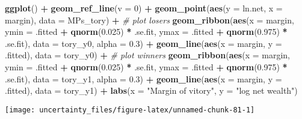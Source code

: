 \documentclass[]{book}
\newenvironment{Shaded}{\begin{snugshade}}{\end{snugshade}}
\newcommand{\KeywordTok}[1]{\textcolor[rgb]{0.13,0.29,0.53}{\textbf{#1}}}
\newcommand{\DataTypeTok}[1]{\textcolor[rgb]{0.13,0.29,0.53}{#1}}
\newcommand{\DecValTok}[1]{\textcolor[rgb]{0.00,0.00,0.81}{#1}}
\newcommand{\FloatTok}[1]{\textcolor[rgb]{0.00,0.00,0.81}{#1}}
\newcommand{\StringTok}[1]{\textcolor[rgb]{0.31,0.60,0.02}{#1}}
\newcommand{\CommentTok}[1]{\textcolor[rgb]{0.56,0.35,0.01}{\textit{#1}}}
\newcommand{\OperatorTok}[1]{\textcolor[rgb]{0.81,0.36,0.00}{\textbf{#1}}}
\newcommand{\NormalTok}[1]{#1}
\theoremstyle{definition}
\theoremstyle{definition}
\theoremstyle{definition}
\theoremstyle{remark}
\begin{document}
\begin{Shaded}
\begin{Highlighting}[]
\KeywordTok{ggplot}\NormalTok{() }\OperatorTok{+}
\StringTok{  }\KeywordTok{geom_ref_line}\NormalTok{(}\DataTypeTok{v =} \DecValTok{0}\NormalTok{) }\OperatorTok{+}
\StringTok{  }\KeywordTok{geom_point}\NormalTok{(}\KeywordTok{aes}\NormalTok{(}\DataTypeTok{y =}\NormalTok{ ln.net, }\DataTypeTok{x =}\NormalTok{ margin), }\DataTypeTok{data =}\NormalTok{ MPs_tory) }\OperatorTok{+}
\StringTok{  }\CommentTok{# plot losers}
\StringTok{  }\KeywordTok{geom_ribbon}\NormalTok{(}\KeywordTok{aes}\NormalTok{(}\DataTypeTok{x =}\NormalTok{ margin,}
                  \DataTypeTok{ymin =}\NormalTok{ .fitted }\OperatorTok{+}\StringTok{ }\KeywordTok{qnorm}\NormalTok{(}\FloatTok{0.025}\NormalTok{) }\OperatorTok{*}\StringTok{ }\NormalTok{.se.fit,}
                  \DataTypeTok{ymax =}\NormalTok{ .fitted }\OperatorTok{+}\StringTok{ }\KeywordTok{qnorm}\NormalTok{(}\FloatTok{0.975}\NormalTok{) }\OperatorTok{*}\StringTok{ }\NormalTok{.se.fit),}
              \DataTypeTok{data =}\NormalTok{ tory_y0, }\DataTypeTok{alpha =} \FloatTok{0.3}\NormalTok{) }\OperatorTok{+}
\StringTok{  }\KeywordTok{geom_line}\NormalTok{(}\KeywordTok{aes}\NormalTok{(}\DataTypeTok{x =}\NormalTok{ margin, }\DataTypeTok{y =}\NormalTok{ .fitted), }\DataTypeTok{data =}\NormalTok{ tory_y0) }\OperatorTok{+}
\StringTok{  }\CommentTok{# plot winners}
\StringTok{  }\KeywordTok{geom_ribbon}\NormalTok{(}\KeywordTok{aes}\NormalTok{(}\DataTypeTok{x =}\NormalTok{ margin,}
                  \DataTypeTok{ymin =}\NormalTok{ .fitted }\OperatorTok{+}\StringTok{ }\KeywordTok{qnorm}\NormalTok{(}\FloatTok{0.025}\NormalTok{) }\OperatorTok{*}\StringTok{ }\NormalTok{.se.fit,}
                  \DataTypeTok{ymax =}\NormalTok{ .fitted }\OperatorTok{+}\StringTok{ }\KeywordTok{qnorm}\NormalTok{(}\FloatTok{0.975}\NormalTok{) }\OperatorTok{*}\StringTok{ }\NormalTok{.se.fit),}
              \DataTypeTok{data =}\NormalTok{ tory_y1, }\DataTypeTok{alpha =} \FloatTok{0.3}\NormalTok{) }\OperatorTok{+}
\StringTok{  }\KeywordTok{geom_line}\NormalTok{(}\KeywordTok{aes}\NormalTok{(}\DataTypeTok{x =}\NormalTok{ margin, }\DataTypeTok{y =}\NormalTok{ .fitted), }\DataTypeTok{data =}\NormalTok{ tory_y1) }\OperatorTok{+}
\StringTok{  }\KeywordTok{labs}\NormalTok{(}\DataTypeTok{x =} \StringTok{"Margin of vitory"}\NormalTok{, }\DataTypeTok{y =} \StringTok{"log net wealth"}\NormalTok{)}
\end{Highlighting}
\end{Shaded}

\begin{center}\texttt{[image: uncertainty\_files/figure-latex/unnamed-chunk-81-1]} \end{center}
\end{document}
